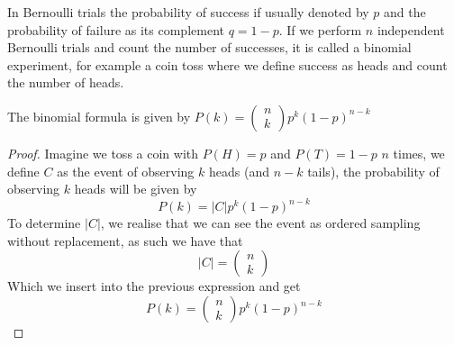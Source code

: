 In Bernoulli trials the probability of success if usually denoted by $p$ and the probability of failure as its complement $q=1-p$. If we perform $n$ independent Bernoulli trials and count the number of successes, it is called a binomial experiment, for example a coin toss where we define success as heads and count the number of heads. 
\begin{theorem}
    The binomial formula is given by $P(k)=\begin{pmatrix}n\\k\end{pmatrix}p^{k}(1-p)^{n-k}$
\end{theorem}
\begin{proof}
    Imagine we toss a coin with $P(H)=p$ and $P(T)=1-p$ $n$ times, we define $C$ as the event of observing $k$ heads (and $n-k$ tails), the probability of observing $k$ heads will be given by
    \[
        P(k)=|C|p^{k}(1-p)^{n-k}
    \]
    To determine $|C|$, we realise that we can see the event as ordered sampling without replacement, as such we have that
    \[
        |C|=\begin{pmatrix}n\\k\end{pmatrix}
    \]
    Which we insert into the previous expression and get
    \[
        P(k)=\begin{pmatrix}n\\k\end{pmatrix}p^{k}(1-p)^{n-k}
    \]
\end{proof}

